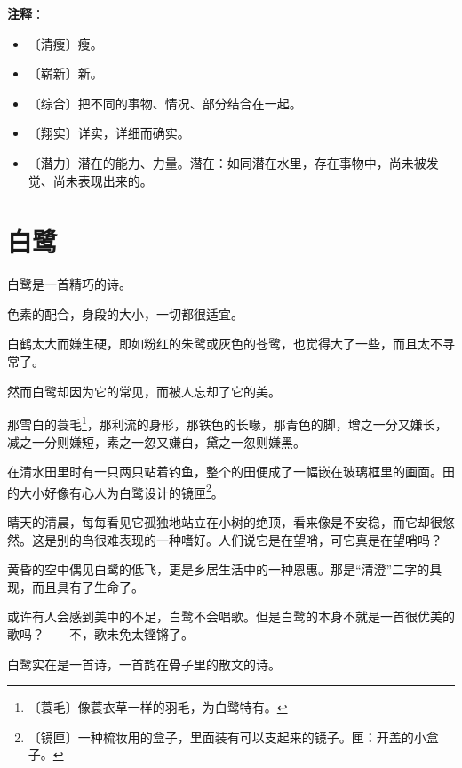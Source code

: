 \documentclass[12pt,UTF-8,openany]{ctexbook}
\begin{document}
\newpage

\textbf{注释}：

\vspace{-1em}

\begin{itemize}
    \setlength\itemsep{-0.2em}
    \item 〔清瘦〕瘦。
    \item 〔崭新〕新。
    \item 〔综合〕把不同的事物、情况、部分结合在一起。
    \item 〔翔实〕详实，详细而确实。
    \item 〔潜力〕潜在的能力、力量。潜在：如同潜在水里，存在事物中，尚未被发觉、尚未表现出来的。
\end{itemize}

\chapter{白鹭}

\begin{Large}
    
    白鹭是一首精巧的诗。
    
    色素的配合，身段的大小，一切都很适宜。
    
    白鹤太大而嫌生硬，即如粉红的朱鹭或灰色的苍鹭，也觉得大了一些，而且太不寻常了。
    
    然而白鹭却因为它的常见，而被人忘却了它的美。
    
    那雪白的蓑毛\footnote{〔蓑毛〕像蓑衣草一样的羽毛，为白鹭特有。}，那利流的身形，那铁色的长喙，那青色的脚，增之一分又嫌长，减之一分则嫌短，素之一忽又嫌白，黛之一忽则嫌黑。
    
    在清水田里时有一只两只站着钓鱼，整个的田便成了一幅嵌在玻璃框里的画面。田的大小好像有心人为白鹭设计的镜匣\footnote{〔镜匣〕一种梳妆用的盒子，里面装有可以支起来的镜子。匣：开盖的小盒子。}。
    
    晴天的清晨，每每看见它孤独地站立在小树的绝顶，看来像是不安稳，而它却很悠然。这是别的鸟很难表现的一种嗜好。人们说它是在望哨，可它真是在望哨吗？
    
    黄昏的空中偶见白鹭的低飞，更是乡居生活中的一种恩惠。那是“清澄”二字的具现，而且具有了生命了。
    
    或许有人会感到美中的不足，白鹭不会唱歌。但是白鹭的本身不就是一首很优美的歌吗？——不，歌未免太铿锵了。
    
    白鹭实在是一首诗，一首韵在骨子里的散文的诗。
    
\end{Large}
\end{document}
